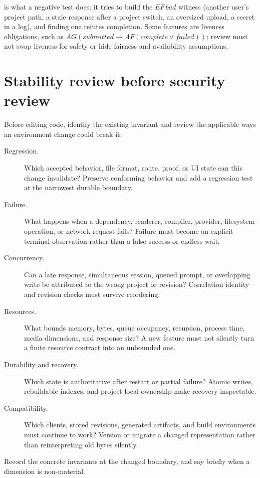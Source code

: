 is what a negative test does: it tries to build the $EF\,bad$ witness (another
user's project path, a stale response after a project switch, an oversized upload,
a secret in a log), and finding one refutes completion. Some features are liveness
obligations, such as $AG(submitted\rightarrow AF(complete\lor failed))$; review
must not swap liveness for safety or hide fairness and availability assumptions.

\section{Stability review before security review}

Before editing code, identify the existing invariant and review the applicable
ways an environment change could break it:

\begin{description}
  \item[Regression.] Which accepted behavior, file format, route, proof, or UI
    state can this change invalidate?  Preserve conforming behavior and add a
    regression test at the narrowest durable boundary.
  \item[Failure.] What happens when a dependency, renderer, compiler, provider,
    filesystem operation, or network request fails?  Failure must become an
    explicit terminal observation rather than a false success or endless wait.
  \item[Concurrency.] Can a late response, simultaneous session, queued prompt,
    or overlapping write be attributed to the wrong project or revision?
    Correlation identity and revision checks must survive reordering.
  \item[Resources.] What bounds memory, bytes, queue occupancy, recursion,
    process time, media dimensions, and response size?  A new feature must not
    silently turn a finite resource contract into an unbounded one.
  \item[Durability and recovery.] Which state is authoritative after restart or
    partial failure?  Atomic writes, rebuildable indexes, and project-local
    ownership make recovery inspectable.
  \item[Compatibility.] Which clients, stored revisions, generated artifacts,
    and build environments must continue to work?  Version or migrate a changed
    representation rather than reinterpreting old bytes silently.
\end{description}

Record the concrete invariants at the changed boundary, and say briefly when a
dimension is non-material.

